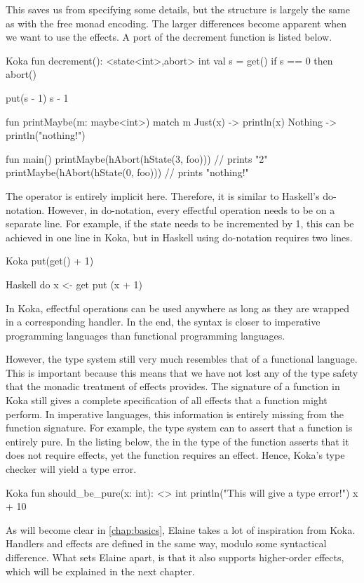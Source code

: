 \noindent This saves us from specifying some details, but the structure is largely the same as with the free monad encoding. The larger differences become apparent when we want to use the effects. A port of the decrement function is listed below.

\begin{lst}{Koka}
fun decrement(): <state<int>,abort> int
  val s = get()
  if s == 0 then
    abort()
  
  put(s - 1)
  s - 1 

fun printMaybe(m: maybe<int>)
  match m
    Just(x) -> println(x)
    Nothing -> println("nothing!")

fun main()
  printMaybe(hAbort(hState(3, foo))) // prints "2"
  printMaybe(hAbort(hState(0, foo))) // prints "nothing!"
\end{lst}

\noindent The \hs{>>=} operator is entirely implicit here. Therefore, it is similar to Haskell's do-notation. However, in do-notation, every effectful operation needs to be on a separate line. For example, if the state needs to be incremented by 1, this can be achieved in one line in Koka, but in Haskell using do-notation requires two lines.

\begin{lst}{Koka}
put(get() + 1)
\end{lst}
\begin{lst}{Haskell}
do
  x <- get
  put (x + 1)
\end{lst}

\noindent In Koka, effectful operations can be used anywhere as long as they are wrapped in a corresponding handler. In the end, the syntax is closer to imperative programming languages than functional programming languages.

However, the type system still very much resembles that of a functional language. This is important because this means that we have not lost any of the type safety that the monadic treatment of effects provides. The signature of a function in Koka still gives a complete specification of all effects that a function might perform. In imperative languages, this information is entirely missing from the function signature. For example, the type system can to assert that a function is entirely pure. In the listing below, the \hs{<>} in the type of the function asserts that it does not require effects, yet the  function requires an effect. Hence, Koka's type checker will yield a type error.

\begin{lst}{Koka}
fun should_be_pure(x: int): <> int
  println("This will give a type error!")
  x + 10
\end{lst}

As will become clear in \cref{chap:basics}, Elaine takes a lot of inspiration from Koka. Handlers and effects are defined in the same way, modulo some syntactical difference. What sets Elaine apart, is that it also supports higher-order effects, which will be explained in the next chapter.

